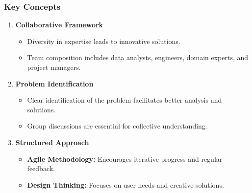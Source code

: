 \documentclass{beamer}
\begin{document}
\begin{frame}[fragile]
    \frametitle{Key Concepts}
    \begin{enumerate}
        \item \textbf{Collaborative Framework}
        \begin{itemize}
            \item Diversity in expertise leads to innovative solutions.
            \item Team composition includes data analysts, engineers, domain experts, and project managers.
        \end{itemize}
    
        \item \textbf{Problem Identification}
        \begin{itemize}
            \item Clear identification of the problem facilitates better analysis and solutions.
            \item Group discussions are essential for collective understanding.
        \end{itemize}
    
        \item \textbf{Structured Approach}
        \begin{itemize}
            \item \textbf{Agile Methodology:} Encourages iterative progress and regular feedback.
            \item \textbf{Design Thinking:} Focuses on user needs and creative solutions.
        \end{itemize}
    \end{enumerate}
\end{frame}
\end{document}
